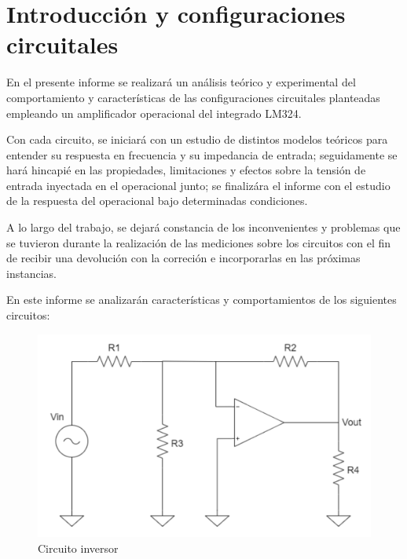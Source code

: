 \section{Introducción y configuraciones circuitales}

En el presente informe se realizará un análisis teórico y experimental del comportamiento y características de las configuraciones 
circuitales planteadas empleando un amplificador operacional del integrado LM324. 

Con cada circuito, se iniciará con un estudio de distintos modelos teóricos para entender su respuesta en frecuencia y su impedancia de entrada; seguidamente
se hará hincapié en las propiedades, limitaciones y efectos sobre la tensión de entrada inyectada en el operacional junto; se finalizára el informe con el estudio de la 
respuesta del operacional bajo determinadas condiciones. 

A lo largo del trabajo, se dejará constancia de los inconvenientes y problemas que se tuvieron durante la realización de las mediciones sobre los circuitos con el fin de recibir una devolución con
la correción e incorporarlas en las próximas instancias.

En este informe se analizarán características y comportamientos de los siguientes circuitos:

\begin{figure}[H]
	\centering
	\includegraphics[scale=0.3]{./Imagenes/circInversor.png}
	\caption{Circuito inversor}
	\label{fig:circInv}
\end{figure}


